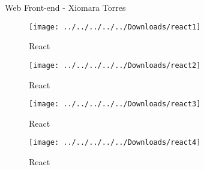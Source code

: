 {Web Front-end - Xiomara Torres }
\begin{figure}
	\centering
	\texttt{[image: ../../../../../Downloads/react1]}
	\caption{React}
	\label{React}
\end{figure}
\begin{figure}
	\centering
	\texttt{[image: ../../../../../Downloads/react2]}
	\caption{React}
	\label{React2}
\end{figure}
\begin{figure}
	\centering
	\texttt{[image: ../../../../../Downloads/react3]}
	\caption{React}
	\label{React3}
\end{figure}
\begin{figure}
	\centering
	\texttt{[image: ../../../../../Downloads/react4]}
	\caption{React}
	\label{React4}
\end{figure}








